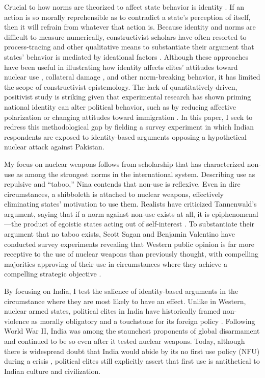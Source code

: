 \documentclass[12pt]{article}
\begin{document}
Crucial to how norms are theorized to affect state behavior is identity \citep{finnemore_international_1998}. If an action is so morally reprehensible as to contradict a state's perception of itself, then it will refrain from whatever that action is. Because identity and norms are difficult to measure numerically, constructivist scholars have often resorted to process-tracing and other qualitative means to substantiate their argument that states' behavior is mediated by ideational factors \citep{peez_contributions_2022}. Although these approaches have been useful in illustrating how identity affects elites' attitudes toward nuclear use \citep{tannenwald_nuclear_2007}, collateral damage \citep{crawford_accountability_2013}, and other norm-breaking behavior, it has limited the scope of constructivist epistemology. The lack of quantitatively-driven, positivist study is striking given that experimental research has shown priming national identity can alter political behavior, such as by reducing affective polarization \citep{levendusky_americans_2018} or changing attitudes toward immigration \citep{wojcieszak_social_2018}. In this paper, I seek to redress this methodological gap by fielding a survey experiment in which Indian respondents are exposed to identity-based arguments opposing a hypothetical nuclear attack against Pakistan. 

My focus on nuclear weapons follows from scholarship that has characterized non-use as among the strongest norms in the international system. Describing use as repulsive and “taboo,” Nina \citet{tannenwald_nuclear_2007} contends that non-use is reflexive. Even in dire circumstances, a shibboleth is attached to nuclear weapons, effectively eliminating states' motivation to use them. Realists have criticized Tannenwald's argument, saying that if a norm against non-use exists at all, it is epiphenomenal—the product of egoistic states acting out of self-interest \citep{sagan_realist_2004}. To substantiate their argument that no taboo exists, Scott Sagan and Benjamin Valentino have conducted survey experiments revealing that Western public opinion is far more receptive to the use of nuclear weapons than previously thought, with compelling majorities approving of their use in circumstances where they achieve a compelling strategic objective \citep{press_atomic_2013, sagan_revisiting_2017, dill_kettles_2022}.

By focusing on India, I test the salience of identity-based arguments in the circumstance where they are most likely to have an effect. Unlike in Western, nuclear armed states, political elites in India have historically framed non-violence as morally obligatory and a touchstone for its foreign policy \citep{perkovich_indias_2001, hymans_psychology_2006, mehta_still_2009, bajpai_indian_2014}. Following World War II, India was among the staunchest proponents of global disarmament and continued to be so even after it tested nuclear weapons. Today, although there is widespread doubt that India would abide by its no first use policy (NFU) during a crisis \citep{clary_indias_2019, sundaram_india_2018}, political elites still explicitly assert that first use is antithetical to Indian culture and civilization.
\end{document}
